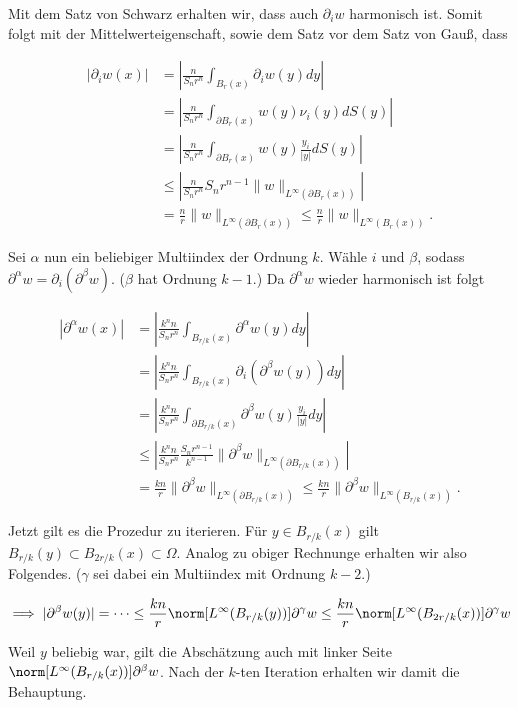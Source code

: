 \begin{solution}

Mit dem Satz von Schwarz erhalten wir, dass auch $\partial_i w$ harmonisch ist.
Somit folgt mit der Mittelwerteigenschaft, sowie dem Satz vor dem Satz von Gauß, dass

\begin{align*}
  |\partial_iw(x)|
  &= \left|\frac{n}{S_nr^n}\int_{B_{r}(x)}\partial_iw(y) dy\right| \\
  &= \left|\frac{n}{S_nr^n}\int_{\partial B_{r}(x)}w(y)\nu_i(y) dS(y)\right| \\
  &= \left|\frac{n}{S_nr^n}\int_{\partial B_{r}(x)}w(y)\frac{y_i}{|y|} dS(y)\right| \\
  &\leq \left|\frac{n}{S_nr^n}S_nr^{n-1}\|w\|_{L^\infty(\partial B_{r}(x))}\right| \\
  &= \frac{n}{r}\|w\|_{L^\infty(\partial B_{r}(x))} \leq \frac{n}{r}\|w\|_{L^\infty(B_{r}(x))}.
\end{align*}

Sei $\alpha$ nun ein beliebiger Multiindex der Ordnung $k$.
Wähle $i$ und $\beta$, sodass $\partial^\alpha w = \partial_i(\partial^\beta w)$.
($\beta$ hat Ordnung $k-1$.)
Da $\partial^\alpha w$ wieder harmonisch ist folgt

\begin{align*}
  |\partial^\alpha w(x)|
  &= \left|\frac{k^nn}{S_nr^n}\int_{B_{r/k}(x)}\partial^\alpha w(y) dy\right| \\
  &= \left|\frac{k^nn}{S_nr^n}\int_{B_{r/k}(x)}\partial_i(\partial^\beta w(y)) dy\right| \\
  &= \left|\frac{k^nn}{S_nr^n}\int_{\partial B_{r/k}(x)}\partial^\beta w(y)\frac{y_i}{|y|} dy\right| \\
  &\leq \left|\frac{k^nn}{S_nr^n}\frac{S_nr^{n-1}}{k^{n-1}}
  \|\partial^\beta w\|_{L^\infty(\partial B_{r/k}(x))}\right| \\
  &= \frac{kn}{r}\|\partial^\beta w\|_{L^\infty(\partial B_{r/k}(x))}
  \leq \frac{kn}{r}\|\partial^\beta w\|_{L^\infty( B_{r/k}(x))}.
\end{align*}

Jetzt gilt es die Prozedur zu iterieren.
Für $y \in B_{r/k}(x)$ gilt $B_{r/k}(y) \subset B_{2r/k}(x) \subset \Omega$.
Analog zu obiger Rechnunge erhalten wir also Folgendes.
($\gamma$ sei dabei ein Multiindex mit Ordnung $k-2$.)

\begin{align*}
  \implies
  |\partial^\beta w(y)|
  =
  \cdots
  \leq
  \frac{kn}{r}
  \norm
  [
    L^\infty(B_{r/k}(y))
  ]
  {\partial^\gamma w}
  \leq
  \frac{kn}{r}
  \norm
  [
    L^\infty(B_{2r/k}(x))
  ]
  {\partial^\gamma w}
\end{align*}

Weil $y$ beliebig war, gilt die Abschätzung auch mit linker Seite $\norm[L^\infty( B_{r/k}(x))]{\partial^\beta w}$.
Nach der $k$-ten Iteration erhalten wir damit die Behauptung.

\end{solution}

